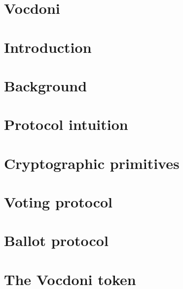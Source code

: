 \documentclass[runningheads, draft]{llncs}
\begin{document}

\setcounter{tocdepth}{3}
\makeatletter
\renewcommand*\l@author[2]{}
\renewcommand*\l@title[2]{}
\makeatletter
\tableofcontents

\section*{Vocdoni}
\label{sec:intro-old}


\section{Introduction}
\label{sec:intro}


\section{Background}
\label{sec:background}


\newpage
\section{Protocol intuition}
\label{sec:protocol-intuition}


\newpage
\section{Cryptographic primitives} %
\label{sec:cryptographic-primitives}


\newpage
\section{Voting protocol}
\label{sec:vocdoni-protocol}



\newpage
\section{Ballot protocol}
\label{sec:ballot-protocol}


\section{The Vocdoni token}
\label{sec:token}

\end{document}

